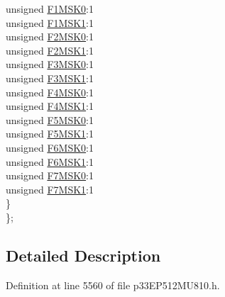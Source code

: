 \begin{DoxyCompactItemize}
\begin{tabbing}
\>\>unsigned \hyperlink{structtag_c2_f_m_s_k_s_e_l1_b_i_t_s_a9952c847f79c84f50eb02eb25c142de1}{F1MSK0}:1\\
\>\>unsigned \hyperlink{structtag_c2_f_m_s_k_s_e_l1_b_i_t_s_a919e35cf03d0a1f2f5051592ffa9cbfd}{F1MSK1}:1\\
\>\>unsigned \hyperlink{structtag_c2_f_m_s_k_s_e_l1_b_i_t_s_ac6a4a18ae01fc381bafcb1191120e5fe}{F2MSK0}:1\\
\>\>unsigned \hyperlink{structtag_c2_f_m_s_k_s_e_l1_b_i_t_s_a059bf9904fd1de3fba0cd36b4e707844}{F2MSK1}:1\\
\>\>unsigned \hyperlink{structtag_c2_f_m_s_k_s_e_l1_b_i_t_s_a933f211511778f34f7197d6f1446cfbf}{F3MSK0}:1\\
\>\>unsigned \hyperlink{structtag_c2_f_m_s_k_s_e_l1_b_i_t_s_acbfd612dda2ea9093d48421a1a6aeb85}{F3MSK1}:1\\
\>\>unsigned \hyperlink{structtag_c2_f_m_s_k_s_e_l1_b_i_t_s_a0b57e26cbb8ac3d7f23e2ff52ad93448}{F4MSK0}:1\\
\>\>unsigned \hyperlink{structtag_c2_f_m_s_k_s_e_l1_b_i_t_s_a056b9705d3f187f6a3b8d56a7f025d47}{F4MSK1}:1\\
\>\>unsigned \hyperlink{structtag_c2_f_m_s_k_s_e_l1_b_i_t_s_aabf68eb84d0abaaea6eb58ea0c6717a2}{F5MSK0}:1\\
\>\>unsigned \hyperlink{structtag_c2_f_m_s_k_s_e_l1_b_i_t_s_a4de591dd5403c030c6e9401d402ab2e0}{F5MSK1}:1\\
\>\>unsigned \hyperlink{structtag_c2_f_m_s_k_s_e_l1_b_i_t_s_ae8e2fb6480a891f846d5cec6322ca288}{F6MSK0}:1\\
\>\>unsigned \hyperlink{structtag_c2_f_m_s_k_s_e_l1_b_i_t_s_a6bf45a4628328ef6d1065f48315fadc9}{F6MSK1}:1\\
\>\>unsigned \hyperlink{structtag_c2_f_m_s_k_s_e_l1_b_i_t_s_a9b8e5abf9e41a053dd88f7d66b58954c}{F7MSK0}:1\\
\>\>unsigned \hyperlink{structtag_c2_f_m_s_k_s_e_l1_b_i_t_s_a09603fe5f0ffe52b1ab15fea39319ab2}{F7MSK1}:1\\
\>\} \\
\}; \\

\end{tabbing}\end{DoxyCompactItemize}


\subsection{Detailed Description}


Definition at line 5560 of file p33\+E\+P512\+M\+U810.\+h.



